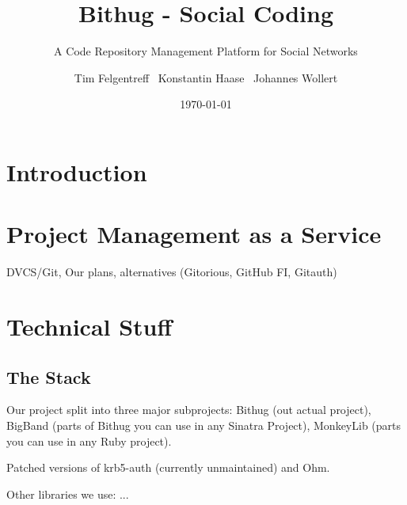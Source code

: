 \documentclass{llncs}
\begin{document}
\pagestyle{headings}  %
\mainmatter %
\title{Bithug - Social Coding}
\subtitle{A Code Repository Management Platform for Social Networks}
\author{Tim Felgentreff~ Konstantin Haase~ Johannes Wollert}
\date{\today}

\maketitle
\begin{abstract}
\end{abstract}
\section{Introduction}

\section{Project Management as a Service}
DVCS/Git, Our plans, alternatives (Gitorious, GitHub FI, Gitauth)

\section{Technical Stuff}

\subsection{The Stack}
Our project split into three major subprojects: Bithug (out actual project), BigBand (parts of Bithug you can use in any Sinatra Project), MonkeyLib (parts you can use in any Ruby project).

Patched versions of krb5-auth (currently unmaintained) and Ohm.

Other libraries we use: ...
\end{document}
